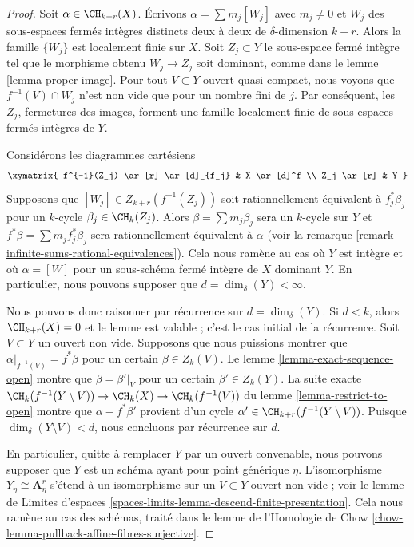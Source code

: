 \begin{proof}
Soit $\alpha \in \CH_{k + r}(X)$. Écrivons $\alpha = \sum m_j[W_j]$ avec
$m_j \not = 0$ et $W_j$ des sous-espaces fermés intègres distincts deux à deux
de $\delta$-dimension $k + r$. Alors la famille $\{W_j\}$ est localement
finie sur $X$. Soit $Z_j \subset Y$ le sous-espace fermé intègre tel que
le morphisme obtenu $W_j \to Z_j$ soit dominant, comme dans le lemme
\ref{lemma-proper-image}. Pour tout $V \subset Y$ ouvert quasi-compact, nous
voyons que $f^{-1}(V) \cap W_j$ n'est non vide que pour un nombre fini de $j$.
Par conséquent, les $Z_j$, fermetures des images, forment une famille
localement finie de sous-espaces fermés intègres de $Y$.

\medskip\noindent
Considérons les diagrammes cartésiens
$$
\xymatrix{
f^{-1}(Z_j) \ar[r] \ar[d]_{f_j} & X \ar[d]^f \\
Z_j \ar[r] & Y
}
$$
Supposons que $[W_j] \in Z_{k + r}(f^{-1}(Z_j))$ soit rationnellement
équivalent à $f_j^*\beta_j$ pour un $k$-cycle $\beta_j \in \CH_k(Z_j)$.
Alors $\beta = \sum m_j \beta_j$ sera un $k$-cycle sur $Y$ et $f^*\beta = \sum
m_j f_j^*\beta_j$ sera rationnellement équivalent à $\alpha$ (voir la remarque
\ref{remark-infinite-sums-rational-equivalences}). Cela nous ramène au cas où $Y$ est
intègre et où $\alpha = [W]$ pour un sous-schéma fermé intègre de $X$ dominant
$Y$. En particulier, nous pouvons supposer que $d = \dim_\delta(Y) < \infty$.

\medskip\noindent
Nous pouvons donc raisonner par récurrence sur $d = \dim_\delta(Y)$. Si $d < k$,
alors $\CH_{k + r}(X) = 0$ et le lemme est valable ; c'est le cas initial de
la récurrence. Soit $V \subset Y$ un ouvert non vide. Supposons que nous
puissions montrer que $\alpha|_{f^{-1}(V)} = f^*\beta$ pour un certain $\beta
\in Z_k(V)$. Le lemme \ref{lemma-exact-sequence-open} montre que
$\beta = \beta'|_V$ pour un certain $\beta' \in Z_k(Y)$. La suite exacte
$\CH_k(f^{-1}(Y \setminus V)) \to \CH_k(X) \to \CH_k(f^{-1}(V))$ du lemme
\ref{lemma-restrict-to-open} montre que $\alpha - f^*\beta'$ provient d'un
cycle $\alpha' \in \CH_{k + r}(f^{-1}(Y \setminus V))$. Puisque $\dim_\delta(Y
\setminus V) < d$, nous concluons par récurrence sur $d$.

\medskip\noindent
En particulier, quitte à remplacer $Y$ par un ouvert convenable, nous pouvons
supposer que $Y$ est un schéma ayant pour point générique $\eta$. L'isomorphisme
$Y_\eta \cong \mathbf{A}^r_\eta$ s'étend à un isomorphisme sur un $V \subset
Y$ ouvert non vide ; voir le lemme de Limites d'espaces
\ref{spaces-limits-lemma-descend-finite-presentation}. Cela nous ramène au cas
des schémas, traité dans le lemme de l'Homologie de Chow
\ref{chow-lemma-pullback-affine-fibres-surjective}.
\end{proof}

